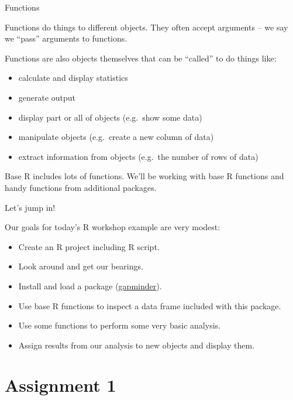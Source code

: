 \documentclass[
  8pt,
  ignorenonframetext,
  dvipsnames]{beamer}
\providecommand{\tightlist}{%
  \setlength{\itemsep}{0pt}\setlength{\parskip}{0pt}}
\let\olditem\item
\renewcommand{\item}{%
  \olditem\vspace{4pt}
}
\begin{document}
\begin{frame}{Functions}
\protect\hypertarget{functions}{}

Functions do things to different objects. They often accept arguments --
we say we ``pass'' arguments to functions.

Functions are also objects themselves that can be ``called'' to do
things like:

\begin{itemize}
\tightlist
\item
  calculate and display statistics
\item
  generate output
\item
  display part or all of objects (e.g.~show some data)
\item
  manipulate objects (e.g.~create a new column of data)
\item
  extract information from objects (e.g.~the number of rows of data)
\end{itemize}

Base R includes lots of functions. We'll be working with base R
functions and handy functions from additional packages.

\end{frame}

\begin{frame}{Let's jump in!}
\protect\hypertarget{lets-jump-in}{}

Our goals for today's R workshop example are very modest:

\begin{itemize}
\tightlist
\item
  Create an R project including R script.
\item
  Look around and get our bearings.
\item
  Install and load a package
  (\href{https://www.gapminder.org/}{gapminder}).
\item
  Use base R functions to inspect a data frame included with this
  package.
\item
  Use some functions to perform some very basic analysis.
\item
  Assign results from our analysis to new objects and display them.
\end{itemize}

\end{frame}

\hypertarget{assignment-1}{%
\section{Assignment 1}\label{assignment-1}}
\end{document}
